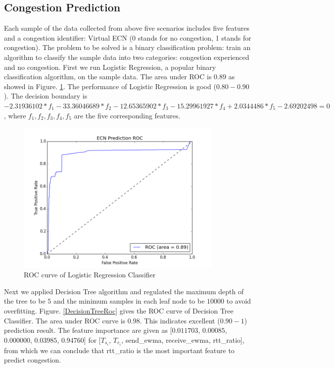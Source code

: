 \subsection{Congestion Prediction}
\label{CongestionPredict}
\par Each sample of the data collected from above five scenarios includes five features and a congestion identifier: Virtual ECN (0 stands for no congestion, 1 stands for congestion). The problem to be solved is a binary classification problem: train an algorithm to classify the sample data into two categories: congestion experienced and no congestion. First we run Logistic Regression, a popular binary classification algorithm, on the sample data. The area under ROC is $0.89$ as showed in Figure. \ref{LRRoc}. The performance of Logistic Regression is good ($0.80 - 0.90$). The decision boundary is $ -2.31936102*f_{1} - 33.36046689*f_{2} - 12.65365902*f_{3} - 15.29961927*f_{4} + 2.0344486*f_{5} - 2.69202498 = 0$, where $f_{1}, f_{2}, f_{3}, f_{4}, f_{5}$ are the five corresponding features.
\begin{figure}
\centering
\includegraphics[width=10cm]{LRRoc.png}
\caption{ROC curve of Logistic Regression Classifier}
\label{LRRoc}
\end{figure}




\par Next we applied Decision Tree algorithm and regulated the maximum depth of the tree to be $5$ and the minimum samples in each leaf node to be $10000$ to avoid overfitting. Figure. \ref{DecisionTreeRoc} gives the ROC curve of Decision Tree Classifier. The area under ROC curve is $0.98$. This indicates excellent ($0.90 - 1$) prediction result. The feature importance are given as [$0.011703$, $0.00085$, $0.000000$, $0.03985$, $0.94760$] for [$T_{s_{i}}$, $T_{r_{i}}$, send\_ewma, receive\_ewma, rtt\_ratio], from which we can conclude that rtt\_ratio is the most important feature to predict congestion. 

